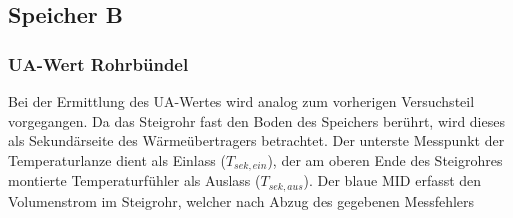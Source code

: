 \subsection{Speicher B}
\subsubsection{UA-Wert Rohrbündel}
Bei der Ermittlung des UA-Wertes wird analog zum vorherigen Versuchsteil vorgegangen. Da das Steigrohr fast den  Boden des Speichers berührt, wird dieses als Sekundärseite des Wärmeübertragers betrachtet. Der unterste Messpunkt der Temperaturlanze dient als Einlass ($T_{sek,ein}$), der am oberen Ende des Steigrohres montierte Temperaturfühler als Auslass ($T_{sek,aus}$). Der blaue MID erfasst den Volumenstrom im Steigrohr, welcher nach Abzug des gegebenen Messfehlers 


